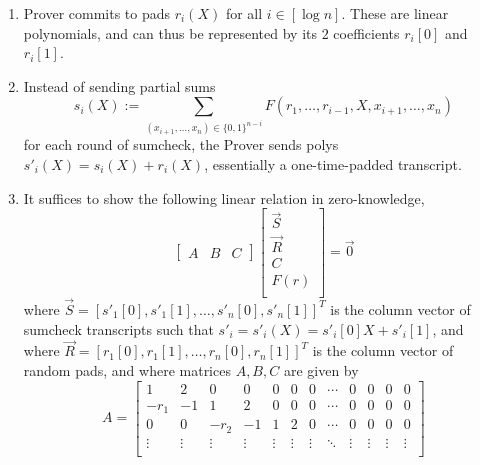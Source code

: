 \begin{mdframed}[style=zkprotocolwithheader, frametitle=Adding ZK to sumcheck]
    \begin{enumerate}
        \item Prover commits to pads $r_i(X)$ for all $i \in [\log n]$. These are linear polynomials, and can thus be represented by its $2$ coefficients $r_i[0]$ and $r_i[1]$.
        \item Instead of sending partial sums 
        \begin{equation*}
        s_i(X) := \sum_{(x_{i+1}, \dots, x_n) \in \{0,1\}^{n-i}} F(r_1, \dots, r_{i-1}, X, x_{i+1}, \dots, x_n)
        \end{equation*}
        for each round of sumcheck, the Prover sends polys $s'_i(X) = s_i(X) + r_i(X)$, essentially a one-time-padded transcript.
        \item It suffices to show the following linear relation in zero-knowledge, 
        \begin{equation*}
        \left[\begin{array}{c|c|c}
        A & B & C
        \end{array}\right]
        \left[\begin{array}{c}
            \vec{S} \\
            \hline
            \vec{R} \\
            \hline
            C \\
            F(r) \\
        \end{array}\right]
        = 
        \vec{0}
        \end{equation*}
        where $\vec{S} = [s'_1[0], s'_1[1], \dots, s'_n[0], s'_n[1]]^T$ 
        is the column vector of sumcheck transcripts such that $s'_i = s'_i(X) = s'_i[0]X + s'_i[1]$, and
        where $\vec{R} = [r_1[0], r_1[1], \dots, r_n[0], r_n[1]]^T$ 
        is the column vector of random pads, and
        where matrices $A,B,C$ are given by
        \begin{equation*}
            A = 
            \begin{bmatrix}
                1 & 2 & 0 & 0 & 0 & 0 & 0 & \cdots & 0 & 0 & 0 & 0 \\
                -r_1 & -1 & 1 & 2 & 0 & 0 & 0 & \cdots & 0 & 0 & 0 & 0 \\
                0 & 0 & -r_2 & -1 & 1 & 2 & 0 & \cdots & 0 & 0 & 0 & 0 \\
                \vdots & \vdots & \vdots & \vdots & \vdots & \vdots & \vdots & \ddots & \vdots & \vdots & \vdots & \vdots \\

\end{bmatrix}
\end{equation*}
\end{enumerate}
\end{mdframed}
